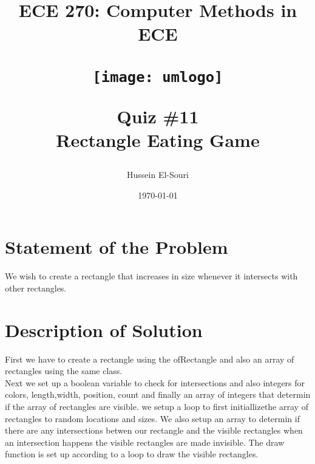 \documentclass[letterpaper, 24pt, final, onecolumn, titlepage] {article}
\title{ECE 270: Computer Methods in ECE \\
	\vspace{1.5cm}
   		\begin{center}\texttt{[image: umlogo]} \end{center}
	\vspace{1.5cm}
	\textbf{Quiz \#11} \\
	Rectangle Eating Game}
\author{Hussein El-Souri}
\date{\today}
\begin{document}
\maketitle

\doublespacing

\section{Statement of the Problem}

We wish to create a rectangle that increases in size whenever it intersects with other rectangles.
\section{Description of Solution}

First we have to create a rectangle using the ofRectangle and also an array of rectangles using the same class.\\
Next we set up a boolean variable to check for intersections and also integers for colors, length,width, position, count and finally an array of integers that determin if the array of rectangles are visible.
we setup a loop to first initiallizethe array of rectangles to random locations and sizes. We also setup an array to determin if there are any intersections betwen our rectangle and the visible rectangles when an intersection happens the visible rectangles are made invisible.
The draw function is set up according to a loop to draw the visible rectangles.
\end{document}
